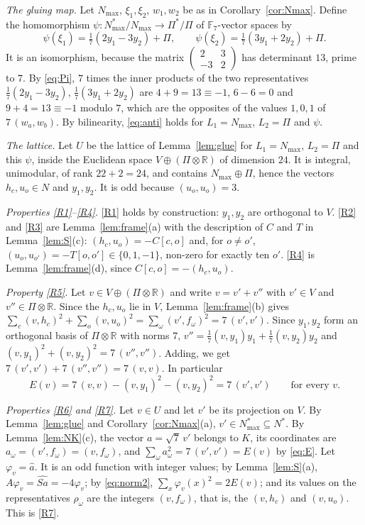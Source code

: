 \documentclass[11pt,a4paper]{article}
\theoremstyle{definition}
\theoremstyle{remark}
\newcommand{\RR}{\mathbb{R}}
\newcommand{\FF}{\mathbb{F}}
\begin{document}
\medskip\noindent\emph{The gluing map.} Let $N_{\max}$, $\xi_1,\xi_2$, $w_1,w_2$ be as in Corollary~\ref{cor:Nmax}.
Define the homomorphism $\psi:N_{\max}^*/N_{\max}\to\Pi^*/\Pi$ of $\FF_7$-vector spaces by
\[
\psi(\xi_1)=\tfrac17(2y_1-3y_2)+\Pi,\qquad\psi(\xi_2)=\tfrac17(3y_1+2y_2)+\Pi .
\]
It is an isomorphism, because the matrix $\left(\begin{smallmatrix}2&3\\-3&2\end{smallmatrix}\right)$ has
determinant $13$, prime to $7$. By \eqref{eq:Pi}, $7$ times the inner products of the two representatives
$\frac17(2y_1-3y_2)$, $\frac17(3y_1+2y_2)$ are $4+9=13\equiv-1$, $6-6=0$ and $9+4=13\equiv-1$ modulo $7$, which are
the opposites of the values $1,0,1$ of $7\,(w_a,w_b)$. By bilinearity, \eqref{eq:anti} holds for $L_1=N_{\max}$,
$L_2=\Pi$ and $\psi$.

\medskip\noindent\emph{The lattice.} Let $U$ be the lattice of Lemma~\ref{lem:glue} for $L_1=N_{\max}$, $L_2=\Pi$
and this $\psi$, inside the Euclidean space $V\oplus(\Pi\otimes\RR)$ of dimension $24$. It is integral, unimodular,
of rank $22+2=24$, and contains $N_{\max}\oplus\Pi$, hence the vectors $h_c,u_o\in N$ and $y_1,y_2$. It is odd
because $(u_o,u_o)=3$.

\medskip\noindent\emph{Properties \ref{R1}--\ref{R4}.} \ref{R1} holds by construction: $y_1,y_2$ are orthogonal to
$V$. \ref{R2} and \ref{R3} are Lemma~\ref{lem:frame}(a) with the description of $C$ and $T$ in
Lemma~\ref{lem:S}(c): $(h_c,u_o)=-C[c,o]$ and, for $o\ne o'$, $(u_o,u_{o'})=-T[o,o']\in\{0,1,-1\}$, non-zero for
exactly ten $o'$. \ref{R4} is Lemma~\ref{lem:frame}(d), since $C[c,o]=-(h_c,u_o)$.

\medskip\noindent\emph{Property \ref{R5}.} Let $v\in V\oplus(\Pi\otimes\RR)$ and write $v=v'+v''$ with $v'\in V$
and $v''\in\Pi\otimes\RR$. Since the $h_c,u_o$ lie in $V$, Lemma~\ref{lem:frame}(b) gives
$\sum_c(v,h_c)^2+\sum_o(v,u_o)^2=\sum_\omega(v',f_\omega)^2=7\,(v',v')$. Since $y_1,y_2$ form an orthogonal basis
of $\Pi\otimes\RR$ with norms $7$, $v''=\frac17(v,y_1)y_1+\frac17(v,y_2)y_2$ and
$(v,y_1)^2+(v,y_2)^2=7\,(v'',v'')$. Adding, we get $7\,(v',v')+7\,(v'',v'')=7\,(v,v)$. In particular
\begin{equation}\label{eq:E}
E(v)=7\,(v,v)-(v,y_1)^2-(v,y_2)^2=7\,(v',v')\qquad\text{for every }v .
\end{equation}

\medskip\noindent\emph{Properties \ref{R6} and \ref{R7}.} Let $v\in U$ and let $v'$ be its projection on $V$. By
Lemma~\ref{lem:glue} and Corollary~\ref{cor:Nmax}(a), $v'\in N_{\max}^*\subseteq N^*$. By Lemma~\ref{lem:NK}(c), the
vector $a=\sqrt7\,v'$ belongs to $K$, its coordinates are $a_\omega=(v',f_\omega)=(v,f_\omega)$, and
$\sum_\omega a_\omega^2=7\,(v',v')=E(v)$ by \eqref{eq:E}. Let $\varphi_v=\hat a$. It is an odd function with integer
values; by Lemma~\ref{lem:S}(a), $A\varphi_v=\widehat{Sa}=-4\varphi_v$; by \eqref{eq:norm2},
$\sum_x\varphi_v(x)^2=2E(v)$; and its values on the representatives $\rho_\omega$ are the integers $(v,f_\omega)$,
that is, the $(v,h_c)$ and $(v,u_o)$. This is \ref{R7}.
\end{document}
